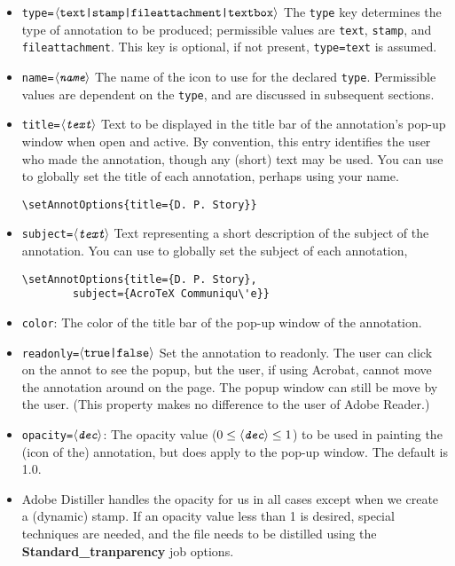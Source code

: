 \documentclass[12pt]{article}
\def\ameta#1{$\langle\textit{\texttt{#1}}\rangle$}
\begin{document}
\begin{itemize}
  \item \texttt{type=\ameta{\upshape{text|stamp|fileattachment|textbox}}} The \texttt{type} key determines the type of annotation to be produced;
        permissible values are \texttt{text}, \texttt{stamp}, and \texttt{fileattachment}. This
        key is optional, if not present, \texttt{type=text} is assumed.
  \item \texttt{name=\ameta{name}} The name of the icon to use for the declared \texttt{type}. Permissible
        values are dependent on the \texttt{type}, and are discussed in subsequent sections.
  \item \texttt{title=\ameta{text}} Text to be displayed in the title bar of the annotation's pop-up window
        when open and active. By convention, this entry identifies the user who made the annotation,
        though any (short) text may be used. You can use  to globally set
        the title of each annotation, perhaps using your name.
\begin{Verbatim}[fontsize=\small]
    \setAnnotOptions{title={D. P. Story}}
\end{Verbatim}
  \item \texttt{subject=\ameta{text}} Text representing a short description of the subject of the annotation.
    You can use  to globally set the subject of each annotation,
\begin{Verbatim}[fontsize=\small]
    \setAnnotOptions{title={D. P. Story},
        subject={AcroTeX Communiqu\'e}}
\end{Verbatim}
  \item \texttt{color}: The color of the title bar of the pop-up window of the annotation.
  \item \texttt{readonly=\ameta{\upshape{true|false}}} Set the annotation to readonly. The user can click on the annot to
    see the popup, but the user, if using Acrobat, cannot move the annotation around on the page.
    The popup window can still be move by the user. (This property makes no difference to the
    user of Adobe Reader.)
  \item \texttt{opacity=\ameta{dec}}: The opacity value ($
          \text0\le\text{\ameta{dec}}\le\text1$) to be used in painting the (icon of
          the) annotation, but does apply to the pop-up window. The default
          is 1.0.
  \item[] Adobe Distiller handles the opacity for us in all cases except when we create a (dynamic) stamp.
        If an opacity value less than 1 is desired, special techniques are needed, and the file needs to
        be distilled using the \textbf{Standard\_tranparency} job options.

\end{itemize}
\end{document}
